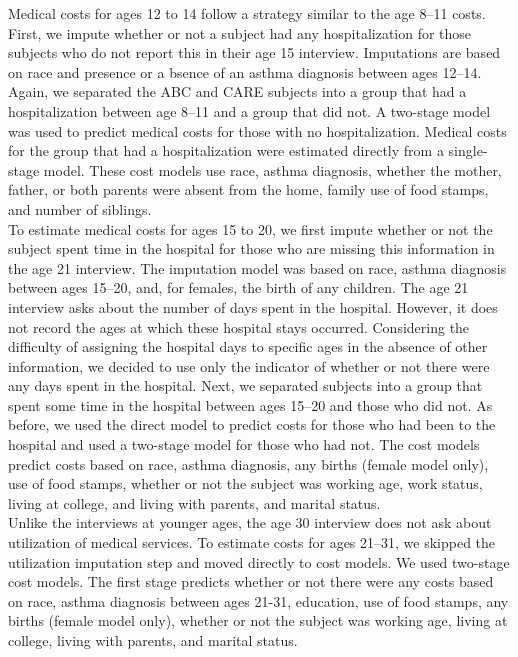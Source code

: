 \noindent Medical costs for ages 12 to 14 follow a strategy similar to the age 8--11 costs. First, we impute whether or not a subject had any hospitalization for those subjects who do not report this in their age 15 interview.  Imputations are based on race and presence or a	bsence of an asthma diagnosis between ages 12--14.  Again, we separated the ABC and CARE subjects into a group that had a hospitalization between age 8--11 and a group that did not.  A two-stage model was used to predict medical costs for those with no hospitalization.  Medical costs for the group that had a hospitalization were estimated directly from a single-stage model.  These cost models use race, asthma diagnosis, whether the mother, father, or both parents were absent from the home, family use of food stamps, and number of siblings.\\

\noindent To estimate medical costs for ages 15 to 20, we first impute whether or not the subject spent time in the hospital for those who are missing this information in the age 21 interview.  The imputation model was based on race, asthma diagnosis between ages 15--20, and, for females, the birth of any children.  The age 21 interview asks about the number of days spent in the hospital.  However, it does not record the ages at which these hospital stays occurred.  Considering the difficulty of assigning the hospital days to specific ages in the absence of other information, we decided to use only the indicator of whether or not there were any days spent in the hospital.  Next, we separated subjects into a group that spent some time in the hospital between ages 15--20 and those who did not.  As before, we used the direct model to predict costs for those who had been to the hospital and used a two-stage model for those who had not.  The cost models predict costs based on race, asthma diagnosis, any births (female model only), use of food stamps, whether or not the subject was working age, work status, living at college, and living with parents, and marital status.\\

\noindent Unlike the interviews at younger ages, the age 30 interview does not ask about utilization of medical services.  To estimate costs for ages 21--31, we skipped the utilization imputation step and moved directly to cost models. We used two-stage cost models.  The first stage predicts whether or not there were any costs based on race, asthma diagnosis between ages 21-31, education, use of food stamps, any births (female model only), whether or not the subject was working age, living at college, living with parents, and marital status.